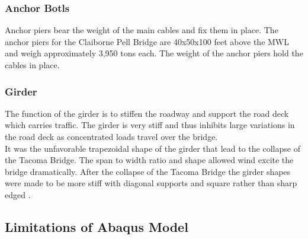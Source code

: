 \subsubsection{Anchor Botls}

Anchor piers bear the weight of the main cables and fix them in place. The anchor piers for the Claiborne Pell Bridge are 40x50x100 feet above the MWL and weigh approximately 3,950 tons each. The weight of the anchor piers hold the cables in place. 

\subsubsection{Girder}

The function of the girder is to stiffen the roadway and support the road deck which carries traffic. The girder is very stiff and thus inhibits large variations in the road deck as concentrated loads travel over the bridge.\\ 
\indent It was the unfavorable trapezoidal shape of the girder that lead to the collapse of the Tacoma Bridge. The span to width ratio and shape allowed wind excite the bridge dramatically. After the collapse of the Tacoma Bridge the girder shapes were made to be more stiff with diagonal supports and square rather than sharp edged \cite{}. 

\subsection{Limitations of Abaqus Model}

